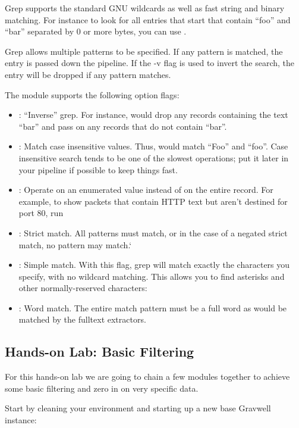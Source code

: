 Grep supports the standard GNU wildcards as well as fast string and binary matching. For instance to look for all entries that start that contain ``foo'' and ``bar'' separated by 0 or more bytes, you can use .

Grep allows multiple patterns to be specified. If any pattern is matched, the entry is passed down the pipeline. If the -v flag is used to invert the search, the entry will be dropped if any pattern matches.

The module supports the following option flags:

\begin{itemize}
\item {}: ``Inverse'' grep. For instance,  would drop any records containing the text ``bar'' and pass on any records that do not contain ``bar''.
\item {}: Match case insensitive values. Thus,  would match ``Foo'' and ``foo''. Case insensitive search tends to be one of the slowest operations; put it later in your pipeline if possible to keep things fast.
\item {}: Operate on an enumerated value instead of on the entire record. For example, to show packets that contain HTTP text but aren’t destined for port 80, run 
\item {}: Strict match. All patterns must match, or in the case of a negated strict match, no pattern may match.`
\item {}: Simple match. With this flag, grep will match exactly the characters you specify, with no wildcard matching. This allows you to find asterisks and other normally-reserved characters: 
\item {}: Word match. The entire match pattern must be a full word as would be matched by the fulltext extractors.
\end{itemize}

\clearpage
\subsection{Hands-on Lab: Basic Filtering}
\label{sec:lab-filter}

For this hands-on lab we are going to chain a few modules together to
achieve some basic filtering and zero in on very specific data.

Start by cleaning your environment and starting up a new base Gravwell
instance:

